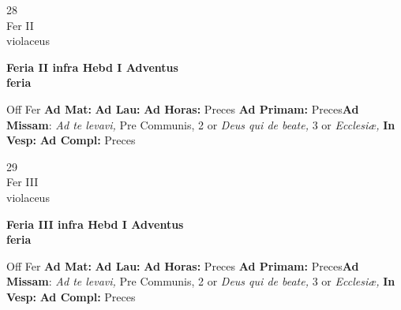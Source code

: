 \documentclass[10pt, openany]{book}
\begin{document}
    \begin{center}
        \begin{minipage}{3.5in}
            \vspace{2em}
            \begin{minipage}{0.5in}
                {\Huge 28} \\
                {\normalsize Fer II} \\
                {\normalsize violaceus}
            \end{minipage}
            \begin{minipage}{3.0in}
                \textbf{ \large Feria II infra Hebd I Adventus \\
                \textnormal{\normalsize feria}} \\ 
            \end{minipage}
            \begin{justify}Off Fer
                \textbf{Ad Mat: }
                \textbf{Ad Lau: }
                \textbf{Ad Horas: }Preces
                \textbf{Ad Primam: }Preces\textbf{Ad Missam}: \textit{Ad te levavi,} Pre Communis, 2 or \textit{Deus qui de beate,} 3 or \textit{Ecclesiæ,}  
                \textbf{In Vesp: }
                \textbf{Ad Compl: }Preces
            \end{justify}
        \end{minipage}
    \end{center}

    \begin{center}
        \begin{minipage}{3.5in}
            \vspace{2em}
            \begin{minipage}{0.5in}
                {\Huge 29} \\
                {\normalsize Fer III} \\
                {\normalsize violaceus}
            \end{minipage}
            \begin{minipage}{3.0in}
                \textbf{ \large Feria III infra Hebd I Adventus \\
                \textnormal{\normalsize feria}} \\ 
            \end{minipage}
            \begin{justify}Off Fer
                \textbf{Ad Mat: }
                \textbf{Ad Lau: }
                \textbf{Ad Horas: }Preces
                \textbf{Ad Primam: }Preces\textbf{Ad Missam}: \textit{Ad te levavi,} Pre Communis, 2 or \textit{Deus qui de beate,} 3 or \textit{Ecclesiæ,}  
                \textbf{In Vesp: }
                \textbf{Ad Compl: }Preces
            \end{justify}
        \end{minipage}
    \end{center}
\end{document}
